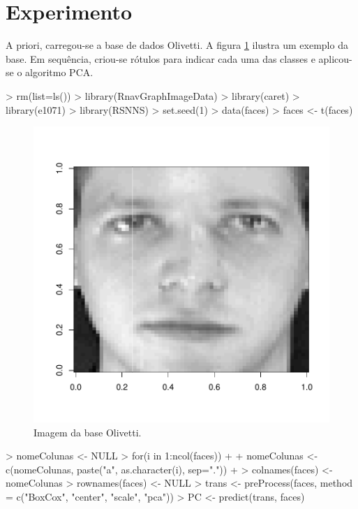 \documentclass[12pt]{article}
\begin{document}
\section{Experimento}

  \par A priori, carregou-se a base de dados Olivetti. A figura \ref{olivetti} ilustra um exemplo da base. Em sequência, criou-se rótulos para indicar cada uma das classes e aplicou-se o algoritmo PCA.

\begin{Schunk}
\begin{Sinput}
> rm(list=ls())
> library(RnavGraphImageData)
> library(caret)
> library(e1071)
> library(RSNNS)
> set.seed(1)
> data(faces)
> faces <- t(faces)
\end{Sinput}
\end{Schunk}

\begin{figure}[ht]
\centering
\includegraphics{PCA-002}

\caption{Imagem da base Olivetti.}
\label{olivetti}
\end{figure}

\begin{Schunk}
\begin{Sinput}
> nomeColunas <- NULL
> for(i in 1:ncol(faces))
+ {
+   nomeColunas <- c(nomeColunas, paste("a", as.character(i), sep="."))
+ }
> colnames(faces) <- nomeColunas
> rownames(faces) <- NULL
> trans <- preProcess(faces, method = c("BoxCox", "center", "scale", "pca"))
> PC <- predict(trans, faces)
\end{Sinput}
\end{Schunk}
\end{document}
